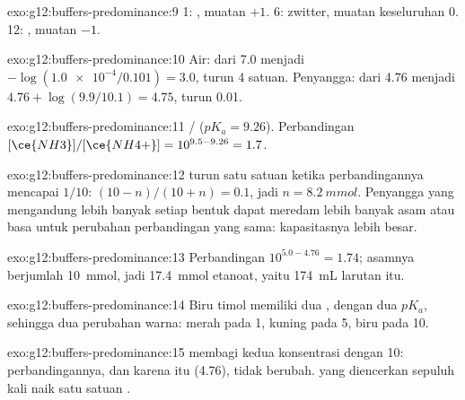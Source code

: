\begin{solution}{exo:g12:buffers-predominance:9}
 1:  , muatan $+1$.  6:  zwitter, muatan
keseluruhan 0.  12:  , muatan $-1$.
\end{solution}

\begin{solution}{exo:g12:buffers-predominance:10}
Air: dari 7.0 menjadi $-\log(\num{1.0e-4}/0.101) = 3.0$, turun 4 satuan.
Penyangga: dari 4.76 menjadi $4.76 + \log(9.9/10.1) = 4.75$, turun 0.01.
\end{solution}

\begin{solution}{exo:g12:buffers-predominance:11}
/ ($pK_a = 9.26$). Perbandingan
$[\ce{NH3}]/[\ce{NH4+}] = 10^{9.5 - 9.26} = 1.7$.
\end{solution}

\begin{solution}{exo:g12:buffers-predominance:12}
 turun satu satuan ketika perbandingannya mencapai $1/10$:
$(10 - n)/(10 + n) = 0.1$, jadi $n = \qty{8.2}{mmol}$. Penyangga yang
mengandung lebih banyak setiap bentuk dapat meredam lebih banyak asam
atau basa untuk perubahan perbandingan yang sama: kapasitasnya lebih
besar.
\end{solution}

\begin{solution}{exo:g12:buffers-predominance:13}
Perbandingan $10^{5.0 - 4.76} = 1.74$; asamnya berjumlah
\qty{10}{mmol}, jadi \qty{17.4}{mmol} etanoat, yaitu \qty{174}{mL}
larutan itu.
\end{solution}

\begin{solution}{exo:g12:buffers-predominance:14}
Biru timol memiliki dua , dengan dua $pK_a$, sehingga
dua perubahan warna: merah pada  1, kuning pada  5, biru pada  10.
\end{solution}

\begin{solution}{exo:g12:buffers-predominance:15}
 membagi kedua konsentrasi dengan 10: perbandingannya, dan
karena itu  (4.76), tidak berubah.  yang diencerkan
sepuluh kali naik satu satuan .
\end{solution}

